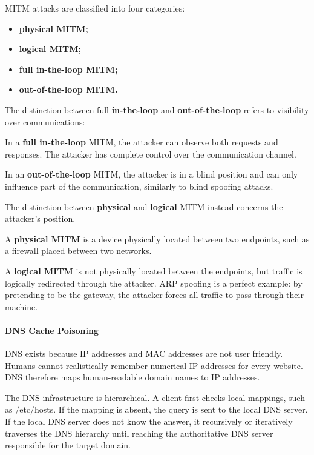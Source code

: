 \documentclass{article}
\begin{document}
MITM attacks are classified into four categories:

\begin{itemize}
\item \textbf{physical MITM;}
\item \textbf{logical MITM;}
\item \textbf{full in-the-loop MITM;}
\item \textbf{out-of-the-loop MITM.}
\end{itemize}

The distinction between full \textbf{in-the-loop} and \textbf{out-of-the-loop}
refers to visibility over communications:

In a \textbf{full in-the-loop} MITM, the attacker can observe both requests
and responses. The attacker has complete control over the communication
channel.

In an \textbf{out-of-the-loop} MITM, the attacker is in a blind position and
can only influence part of the communication, similarly to blind
spoofing attacks.

The distinction between \textbf{physical} and \textbf{logical} MITM instead
concerns the attacker's position.

A \textbf{physical MITM} is a device physically located between two
endpoints, such as a firewall placed between two networks.

A \textbf{logical MITM} is not physically located between the endpoints, but
traffic is logically redirected through the attacker. ARP spoofing is a
perfect example: by pretending to be the gateway, the attacker forces
all traffic to pass through their machine.

\paragraph{DNS Cache Poisoning}

DNS exists because IP addresses and MAC addresses are not user friendly.
Humans cannot realistically remember numerical IP addresses for every
website. DNS therefore maps human-readable domain names to IP addresses.

The DNS infrastructure is hierarchical. A client first checks local
mappings, such as /etc/hosts. If the mapping is absent, the query is
sent to the local DNS server. If the local DNS server does not know the
answer, it recursively or iteratively traverses the DNS hierarchy until
reaching the authoritative DNS server responsible for the target domain.
\end{document}
